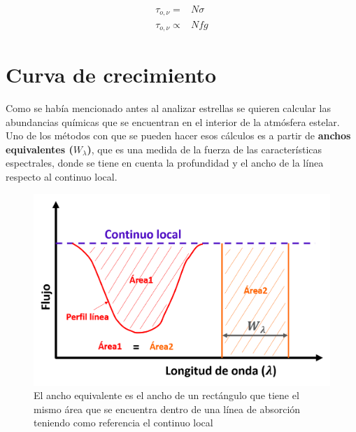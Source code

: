 \documentclass[12pt,oneside,openany,letter]{book}
\begin{document}
\begin{equation}
    \begin{array}{cc}
        \tau_{o, \nu} =& N \sigma \\
        \tau_{o, \nu} \propto& N fg
    \end{array}
    \label{ec:prof_opt}
\end{equation}

\section{Curva de crecimiento}\label{CoG}

Como se había mencionado antes al analizar estrellas se quieren calcular las abundancias químicas que se encuentran en el interior de la atmósfera estelar. Uno de los métodos con que se pueden hacer esos cálculos es a partir de \textbf{anchos equivalentes ($W_{\lambda}$)}, que es una medida de la fuerza de las características espectrales, donde se tiene en cuenta la profundidad y el ancho de la línea respecto al continuo local. 

\begin{figure}[h]
    \centering
    \includegraphics[width=0.6\linewidth]{Images/we.png}
    \caption{El ancho equivalente es el ancho de un rectángulo que tiene el mismo área que se encuentra dentro de una línea de absorción teniendo como referencia el continuo local}
    \label{fig:my_label}
\end{figure}
\end{document}
